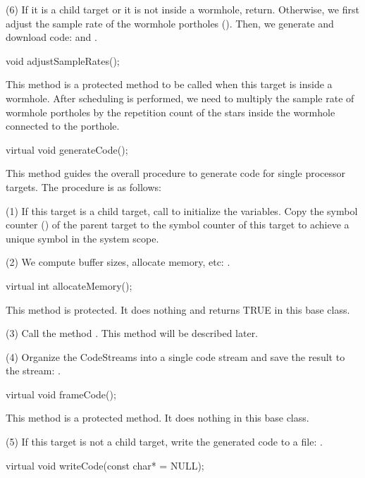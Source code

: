 (6) If it is a child target or it is not inside a wormhole, return.
Otherwise, we first adjust the sample rate of the wormhole portholes
(). Then, we generate and download code:
 and .

\begin{example}
void adjustSampleRates();
\end{example}

This method is a protected method to be called when this target is
inside a wormhole. After scheduling is performed, we need to multiply
the sample rate of wormhole portholes by the repetition
count of the stars inside the wormhole connected to the porthole.

\begin{example}
virtual void generateCode();
\end{example}

This method guides the overall procedure to generate code for single
processor targets. The procedure is as follows:

(1) If this target is a child target, call  to initialize the
variables. Copy the symbol counter () of the parent
target to the symbol counter of this target to achieve a unique symbol
in the system scope.

(2) We compute buffer sizes, allocate memory, etc: .

\begin{example}
virtual int allocateMemory();
\end{example}

This method is protected. It does nothing and returns TRUE in this
base class.

(3) Call the method .  This method will be
described later.

(4) Organize the CodeStreams into a single code stream and save the result
to the  stream: .

\begin{example}
virtual void frameCode();
\end{example}

This method is a protected method. It does nothing in this base
class.

(5) If this target is not a child target, write the generated code
to a file: .

\begin{example}
virtual void writeCode(const char*  = NULL);
\end{example}

